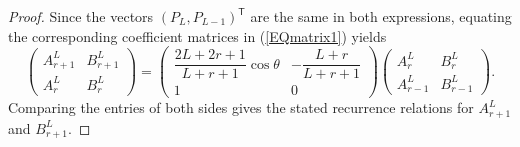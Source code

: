 \documentclass[10pt,a4paper]{amsart}
\renewcommand\eqref[1]{(\ref{#1})} %
\begin{document}
\begin{proof}
Since the vectors $(P_L, P_{L-1})^{\mathsf T}$ are the same in both expressions,
equating the corresponding coefficient matrices in \eqref{EQmatrix1} yields
\[
\begin{pmatrix}
A_{r+1}^L & B_{r+1}^L \\
A_r^L & B_r^L
\end{pmatrix}
=
\begin{pmatrix}
\dfrac{2L+2r+1}{L+r+1}\cos\theta &
-\dfrac{L+r}{L+r+1} \\
1 & 0
\end{pmatrix}
\begin{pmatrix}
A_r^L & B_r^L \\
A_{r-1}^L & B_{r-1}^L
\end{pmatrix}.
\]
Comparing the entries of both sides gives the stated recurrence relations for
$A_{r+1}^L$ and $B_{r+1}^L$.
\end{proof}
\end{document}

